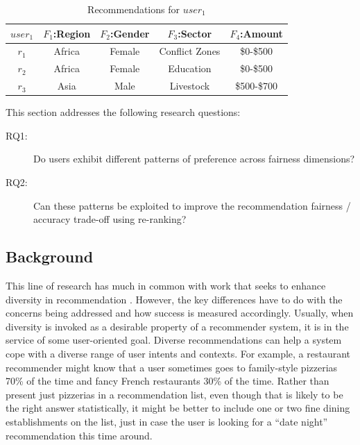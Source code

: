 \vspace{0.25cm}
\begin{table}[tbh]\centering
    \begin{tabular}{|c|c|c|c|c|}
    \hline
        $user_{1}$ & $F_{1}$:Region & $F_{2}$:Gender & $F_{3}$:Sector & $F_{4}$:Amount \\
    \hline
        $r_{1}$ & Africa & Female & Conflict Zones & \$0-\$500\\
    \hline
        $r_{2}$ & Africa & Female & Education & \$0-\$500\\
    \hline \rowcolor[gray]{0.7}
        $r_{3}$ & Asia & Male & Livestock & \$500-\$700\\
    \hline
    \end{tabular}
    \caption{Recommendations for $user_{1}$}
    \label{table_user_recoms}
\end{table}


This section addresses the following research questions:
\begin{description}
    \item [RQ1:] Do users exhibit different patterns of preference across fairness dimensions?
    \item [RQ2:] Can these patterns be exploited to improve the recommendation fairness / accuracy trade-off using re-ranking?
\end{description}

\subsection{Background}
\label{subsec:ofair_backgroundd}

This line of research has much in common with work that seeks to enhance diversity in recommendation \cite{zhang2008MonotonyDiv, vargas2011rankRelDiv, carbonell1998use, eskandanian2017clustering}. However, the key differences have to do with the concerns being addressed and how success is measured accordingly. Usually, when diversity is invoked as a desirable property of a recommender system, it is in the service of some user-oriented goal. Diverse recommendations can help a system cope with a diverse range of user intents and contexts. For example, a restaurant recommender might know that a user sometimes goes to family-style pizzerias 70\% of the time and fancy French restaurants 30\% of the time. Rather than present just pizzerias in a recommendation list, even though that is likely to be the right answer statistically, it might be better to include one or two fine dining establishments on the list, just in case the user is looking for a ``date night'' recommendation this time around. 

